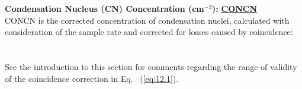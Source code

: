 \begin{hangparagraphs}
\textbf{Condensation Nucleus (CN) Concentration (cm$^{-3}$): }\textbf{\uline{CONCN}}\\
CONCN is the corrected concentration of condensation nuclei, calculated
with consideration of the sample rate and corrected for losses caused
by coincidence: \\
 \\
\\
See the introduction to this section for comments regarding the range
of validity of the coincidence correction in Eq.~ (\ref{eq:12.1}).

\end{hangparagraphs}

